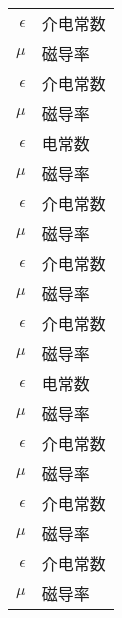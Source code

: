 \begin{nomenclature*}
\begin{longtable}{rl}
  $\epsilon$    & 介电常数 \\
  $\mu$         & 磁导率 \\
  $\epsilon$    & 介电常数 \\
  $\mu$         & 磁导率 \\
  $\epsilon$    & 电常数 \\
  $\mu$         & 磁导率 \\
  $\epsilon$    & 介电常数 \\
  $\mu$         & 磁导率 \\
  $\epsilon$    & 介电常数 \\
  $\mu$         & 磁导率 \\
  $\epsilon$    & 介电常数 \\
  $\mu$         & 磁导率 \\
  $\epsilon$    & 电常数 \\
  $\mu$         & 磁导率 \\
  $\epsilon$    & 介电常数 \\
  $\mu$         & 磁导率 \\
  $\epsilon$    & 介电常数 \\
  $\mu$         & 磁导率 \\
  $\epsilon$    & 介电常数 \\
  $\mu$         & 磁导率 \\
\end{longtable}

\end{nomenclature*}

